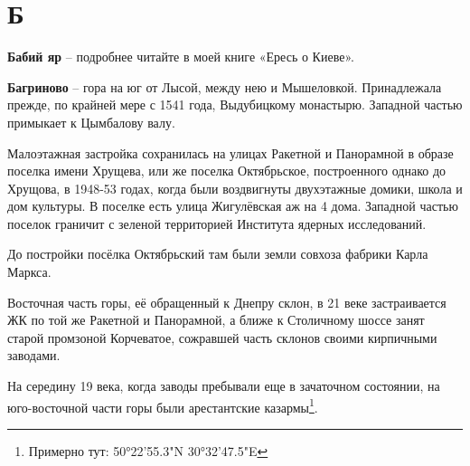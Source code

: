 \chapter*{Б}




\textbf{Бабий яр} – подробнее читайте в моей книге «Ересь о Киеве».\\

\medskip

\textbf{Багриново} – гора на юг от Лысой, между нею и Мышеловкой. Принадлежала прежде, по крайней мере с 1541 года, Выдубицкому монастырю. Западной частью примыкает к Цымбалову валу.

Малоэтажная застройка сохранилась на улицах Ракетной и Панорамной в образе поселка имени Хрущева, или же поселка Октябрьское, построенного однако до Хрущова, в 1948-53 годах, когда были воздвигнуты двухэтажные домики, школа и дом культуры. В поселке есть улица Жигулёвская аж на 4 дома. Западной частью поселок граничит с зеленой территорией Института ядерных исследований.

До постройки посёлка Октябрьский там были земли совхоза фабрики Карла Маркса.

Восточная часть горы, её обращенный к Днепру склон, в 21 веке застраивается ЖК по той же Ракетной и Панорамной, а ближе к Столичному шоссе занят старой промзоной Корчеватое, сожравшей часть склонов своими кирпичными заводами.

На середину 19 века, когда заводы пребывали еще в зачаточном состоянии, на юго-восточ\-ной части горы были арестантские казармы\footnote{Примерно тут: 50°22'55.3"N 30°32'47.5"E}.

